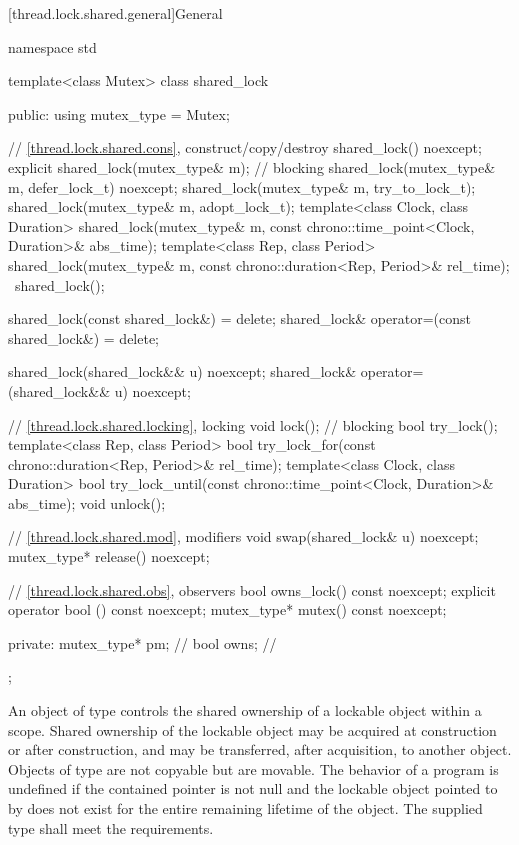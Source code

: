 [thread.lock.shared.general]{General}

%
\begin{codeblock}
namespace std {
  template<class Mutex>
  class shared_lock {
  public:
    using mutex_type = Mutex;

    // \ref{thread.lock.shared.cons}, construct/copy/destroy
    shared_lock() noexcept;
    explicit shared_lock(mutex_type& m);        // blocking
    shared_lock(mutex_type& m, defer_lock_t) noexcept;
    shared_lock(mutex_type& m, try_to_lock_t);
    shared_lock(mutex_type& m, adopt_lock_t);
    template<class Clock, class Duration>
      shared_lock(mutex_type& m, const chrono::time_point<Clock, Duration>& abs_time);
    template<class Rep, class Period>
      shared_lock(mutex_type& m, const chrono::duration<Rep, Period>& rel_time);
    ~shared_lock();

    shared_lock(const shared_lock&) = delete;
    shared_lock& operator=(const shared_lock&) = delete;

    shared_lock(shared_lock&& u) noexcept;
    shared_lock& operator=(shared_lock&& u) noexcept;

    // \ref{thread.lock.shared.locking}, locking
    void lock();                                // blocking
    bool try_lock();
    template<class Rep, class Period>
      bool try_lock_for(const chrono::duration<Rep, Period>& rel_time);
    template<class Clock, class Duration>
      bool try_lock_until(const chrono::time_point<Clock, Duration>& abs_time);
    void unlock();

    // \ref{thread.lock.shared.mod}, modifiers
    void swap(shared_lock& u) noexcept;
    mutex_type* release() noexcept;

    // \ref{thread.lock.shared.obs}, observers
    bool owns_lock() const noexcept;
    explicit operator bool () const noexcept;
    mutex_type* mutex() const noexcept;

  private:
    mutex_type* pm;                             // \expos
    bool owns;                                  // \expos
  };
}
\end{codeblock}

\pnum
An object of type  controls the shared ownership of a
lockable object within a scope. Shared ownership of the lockable object may be
acquired at construction or after construction, and may be transferred, after
acquisition, to another  object. Objects of type
 are not copyable but are movable. The behavior of a program
is undefined if the contained pointer  is not null and the lockable
object pointed to by  does not exist for the entire remaining
lifetime of the  object. The supplied
 type shall meet the 
requirements.

